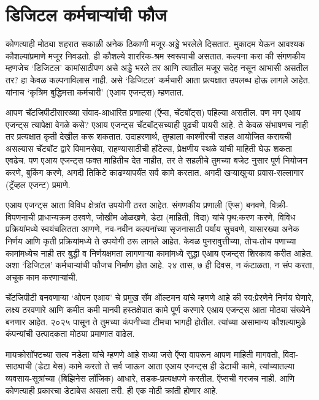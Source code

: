 \chapter{डिजिटल कर्मचाऱ्यांची फौज}

कोणत्याही मोठ्या शहरात सकाळी अनेक ठिकाणी मजूर-अड्डे भरलेले दिसतात. मुकादम येऊन आवश्यक कौशल्यांप्रमाणे मजूर निवडतो. ही कौशल्ये शाररिक-श्रम स्वरूपाची असतात. कल्पना करा की संगणकीय म्हणजेच ‘डिजिटल’ कामांसाठीपण असे अड्डे भरले तर आणि त्यातील मजूर सदेह  नसून आभासी असतील तर? हा केवळ कल्पनाविलास  नाही. असे ‘डिजिटल’ कर्मचारी आता प्रत्यक्षात उपलब्ध होऊ लागले आहेत. यांनाच ‘कृत्रिम बुद्धिमत्ता कर्मचारी’ (एआय एजन्ट्स) म्हणतात. 

आपण चॅटजिपीटीसारख्या संवाद-आधारित प्रणाल्या (ऍप्स, चॅटबॉट्स) पहिल्या असतील. पण मग एआय एजन्ट्स त्यापेक्षा वेगळे कसे? एआय एजन्ट्स चॅटबॉट्सच्याही पुढची पायरी आहे. ते केवळ संभाषणच नाही तर प्रत्यक्षात कृती देखील करू शकतात. उदाहरणार्थ, तुम्हाला काश्मीरची सहल आयोजित करायची असल्यास चॅटबॉट द्वारे विमानसेवा, राहण्यासाठीची हॉटेल्स, प्रेक्षणीय स्थळे यांची माहिती घेऊ शकता एवढेच. पण एआय एजन्ट्स फक्त माहितीच देत नाहीत, तर ते सहलीचे तुमच्या बजेट नुसार पूर्ण नियोजन करणे, बुकिंग करणे, अगदी तिकिटे काढण्यापर्यंत सर्व कामे करतात. अगदी खऱ्याखुऱ्या प्रवास-सल्लागार (ट्रॅव्हल एजन्ट) प्रमाणे. 

एआय एजन्ट्स  आता विविध क्षेत्रांत उपयोगी ठरत आहेत. संगणकीय प्रणाली (ऍप्स) बनवणे, विक्री-विपणनाची प्राधान्यक्रम ठरवणे, जोखीम ओळखणे, डेटा (माहिती, विदा) यांचे पृथ:करण करणे, विविध प्रक्रियांमध्ये स्वयंचलितता आणणे, नव-नवीन कल्पनांच्या सृजनासाठी पर्याय सुचवणे, यासारख्या अनेक निर्णय आणि कृती प्रक्रियांमध्ये ते उपयोगी ठरू लागले आहेत. केवळ पुनरावुत्तीच्या, तोच-तोच पणाच्या कामांमध्येच नाही तर बुद्धी व निर्णयक्षमता लागणाऱ्या कामांमध्ये सुद्धा एआय एजन्ट्स शिरकाव करीत आहेत. अशा ‘डिजिटल’ कर्मचाऱ्यांची फौजच निर्माण होत आहे. २४ तास, ७ ही दिवस, न कंटाळता, न संप करता, अचूक काम करणाऱ्यांची. 

चॅटजिपीटी बनवणाऱ्या ‘ओपन एआय’ चे प्रमुख सॅम ऑल्टमन यांचे म्हणणे आहे की स्व:प्रेरणेने निर्णय घेणारे, लक्ष्य ठरवणारे आणि कमीत कमी मानवी हस्तक्षेपात कामे पूर्ण करणारे एआय एजन्ट्स आता मोठ्या संख्येने बनणार आहेत. २०२५ पासून ते तुमच्या कंपनीच्या टीमचा भागही होतील. त्यांच्या असामान्य कौशल्यामुळे कंपन्यांची उत्पादकता मोठ्या प्रमाणात वाढेल. 

मायक्रोसॉफ्टच्या सत्य नडेला यांचे म्हणणे आहे सध्या जसे ऍप्स वापरून आपण माहिती मागवतो, विदा-साठ्याची  (डेटा बेस) कामे करतो ते सर्व जाऊन आता एआय एजन्ट्स  ही डेटाची कामे, त्यांच्यातल्या व्यवसाय-सूत्रांच्या (बिझिनेस लॉजिक) आधारे, तडक-प्रत्यक्षपणे करतील. ऍप्सची गरजच नाही. आणि कोणत्याही प्रकारचा डेटाबेस असला तरी. ही एक मोठी क्रांती होणार आहे.


